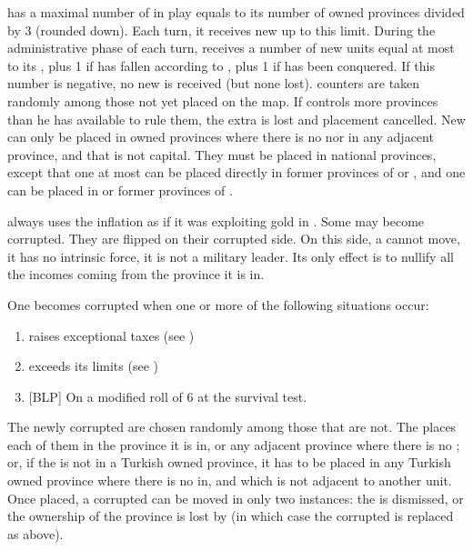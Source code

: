  \TUR has a maximal number of \Pashas in play
equals to its number of owned provinces divided by 3 (rounded down).
Each turn, it receives new \Pashas up to this limit.
\bparag During the administrative phase of each turn, \TUR receives a
number of new \Pasha units equal at most to its \STAB, plus 1 if
 has fallen according to , plus
1 if  has been conquered. If this number is negative, no
new \Pasha is received (but none lost).
\bparag \Pasha counters are taken randomly among those not yet placed
on the map.
\bparag If \TUR controls more provinces than he has available \Pashas
to rule them, the extra is lost and placement cancelled.
 New \Pashas can only be placed in owned
provinces where there is no \Pasha nor in any adjacent province, and
that is not \TUR capital. They must be placed in \TUR national
provinces, except that one at most can be placed directly in former
provinces of  or , and one can be placed in
 or former provinces of .

\label{chSpecific:Turkey:Cost Pashas}
\bparag \TUR always uses the inflation as if it was exploiting gold in
.
\bparag Some \Pashas may become corrupted. They are flipped on their
corrupted side. On this side, a \Pasha cannot move, it has no intrinsic
force, it is not a military leader. Its only effect is to nullify all
the incomes coming from the province it is in.

\aparag[Decadence.] One \Pasha becomes corrupted when one or more of the
following situations occur:
\begin{enumerate}
\item \TUR raises exceptional taxes (see )
\item \TUR exceeds its \MNU limits (see )
\item {[BLP]} On a modified roll of 6 at the survival test.
\end{enumerate}
\bparag The newly corrupted \Pashas are chosen randomly among those that
are not. The \SDCF places each of them in the province it is in, or any
adjacent province where there is no \Pasha; or, if the \Pasha is not in
a Turkish owned province, it has to be placed in any Turkish owned
province where there is no \Pasha in, and which is not adjacent to
another \Pasha unit. Once placed, a corrupted \Pasha can be moved in
only two instances: the \Pasha is dismissed, or the ownership of the
province is lost by \TUR (in which case the corrupted \Pasha is replaced
as above).

